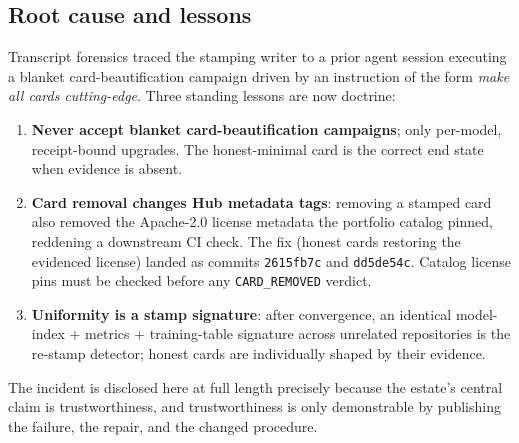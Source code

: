 \subsection{Root cause and lessons}
Transcript forensics traced the stamping writer to a prior agent session executing a blanket card-beautification campaign driven by an instruction of the form \emph{make all cards cutting-edge}. Three standing lessons are now doctrine:
\begin{enumerate}
\item \textbf{Never accept blanket card-beautification campaigns}; only per-model, receipt-bound upgrades. The honest-minimal card is the correct end state when evidence is absent.
\item \textbf{Card removal changes Hub metadata tags}: removing a stamped card also removed the Apache-2.0 license metadata the portfolio catalog pinned, reddening a downstream CI check. The fix (honest cards restoring the evidenced license) landed as commits \texttt{2615fb7c} and \texttt{dd5de54c}. Catalog license pins must be checked before any \texttt{CARD\_REMOVED} verdict.
\item \textbf{Uniformity is a stamp signature}: after convergence, an identical model-index + metrics + training-table signature across unrelated repositories is the re-stamp detector; honest cards are individually shaped by their evidence.
\end{enumerate}
The incident is disclosed here at full length precisely because the estate's central claim is trustworthiness, and trustworthiness is only demonstrable by publishing the failure, the repair, and the changed procedure.
